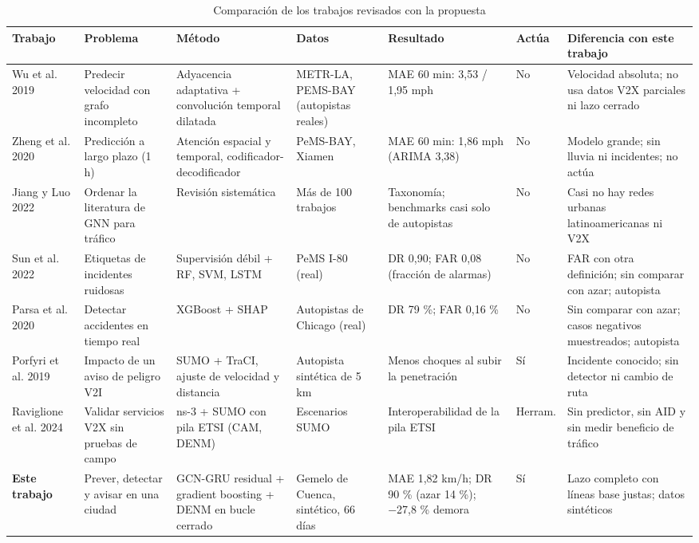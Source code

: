 \begin{table}[t]
\centering
\caption{Comparación de los trabajos revisados con la propuesta}
\label{tab:arte}
\scriptsize
\setlength{\tabcolsep}{3pt}
\begin{tabular}{@{}L{1.75cm}L{2.6cm}L{2.7cm}L{2.3cm}L{2.6cm}L{1.05cm}L{3.4cm}@{}}
\toprule
Trabajo & Problema & Método & Datos & Resultado & Actúa & Diferencia con este trabajo \\
\midrule
Wu et al. 2019~\cite{wu2019graphwavenet} & Predecir velocidad con grafo incompleto & Adyacencia adaptativa + convolución temporal dilatada & METR-LA, PEMS-BAY (autopistas reales) & MAE 60 min: 3,53 / 1,95 mph & No & Velocidad absoluta; no usa datos V2X parciales ni lazo cerrado \\
Zheng et al. 2020~\cite{zheng2020gman} & Predicción a largo plazo (1 h) & Atención espacial y temporal, codificador-decodificador & PeMS-BAY, Xiamen & MAE 60 min: 1,86 mph (ARIMA 3,38) & No & Modelo grande; sin lluvia ni incidentes; no actúa \\
Jiang y Luo 2022~\cite{jiang2022gnnsurvey} & Ordenar la literatura de GNN para tráfico & Revisión sistemática & Más de 100 trabajos & Taxonomía; benchmarks casi solo de autopistas & No & Casi no hay redes urbanas latinoamericanas ni V2X \\
Sun et al. 2022~\cite{sun2022weakaid} & Etiquetas de incidentes ruidosas & Supervisión débil + RF, SVM, LSTM & PeMS I-80 (real) & DR 0,90; FAR 0,08 (fracción de alarmas) & No & FAR con otra definición; sin comparar con azar; autopista \\
Parsa et al. 2020~\cite{parsa2020xgboost} & Detectar accidentes en tiempo real & XGBoost + SHAP & Autopistas de Chicago (real) & DR 79 \%; FAR 0,16 \% & No & Sin comparar con azar; casos negativos muestreados; autopista \\
Porfyri et al. 2019~\cite{porfyri2019rhw} & Impacto de un aviso de peligro V2I & SUMO + TraCI, ajuste de velocidad y distancia & Autopista sintética de 5 km & Menos choques al subir la penetración & Sí & Incidente conocido; sin detector ni cambio de ruta \\
Raviglione et al. 2024~\cite{raviglione2024msvan3t} & Validar servicios V2X sin pruebas de campo & ns-3 + SUMO con pila ETSI (CAM, DENM) & Escenarios SUMO & Interoperabilidad de la pila ETSI & Herram. & Sin predictor, sin AID y sin medir beneficio de tráfico \\
\midrule
\textbf{Este trabajo} & Prever, detectar y avisar en una ciudad & GCN-GRU residual + gradient boosting + DENM en bucle cerrado & Gemelo de Cuenca, sintético, 66 días & MAE 1,82 km/h; DR 90 \% (azar 14 \%); −27,8 \% demora & Sí & Lazo completo con líneas base justas; datos sintéticos \\
\bottomrule
\end{tabular}
\end{table}

